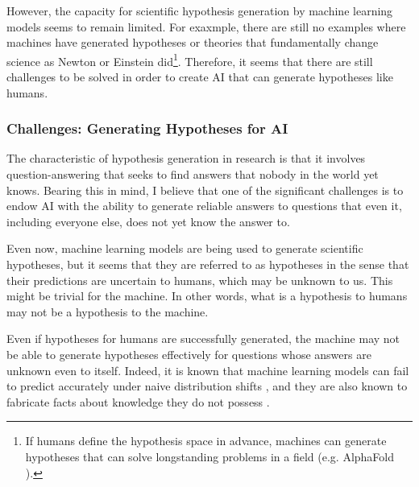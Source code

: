 However, the capacity for scientific hypothesis generation by machine learning models seems to remain limited. For exaxmple, there are still no examples where machines have generated hypotheses or theories that fundamentally change science as Newton or Einstein did\footnote{
If humans define the hypothesis space in advance, machines can generate hypotheses that can solve longstanding problems in a field (e.g. AlphaFold \cite{jumper2021highly}).
}. Therefore, it seems that there are still challenges to be solved in order to create AI that can generate hypotheses like humans.

\subsubsection{Challenges: Generating Hypotheses for AI}
The characteristic of hypothesis generation in research is that it involves question-answering that seeks to find answers that nobody in the world yet knows. Bearing this in mind, I believe that one of the significant challenges is to endow AI with the ability to generate reliable answers to questions that even it, including everyone else, does not yet know the answer to.

Even now, machine learning models are being used to generate scientific hypotheses, but it seems that they are referred to as hypotheses in the sense that their predictions are uncertain to humans, which may be unknown to us. This might be trivial for the machine. In other words, what is a hypothesis to humans may not be a hypothesis to the machine. 

Even if hypotheses for humans are successfully generated, the machine may not be able to generate hypotheses effectively for questions whose answers are unknown even to itself. Indeed, it is known that machine learning models can fail to predict accurately under naive distribution shifts \cite{shen2021towards}, and they are also known to fabricate facts about knowledge they do not possess \cite{maynez2020faithfulness}.


